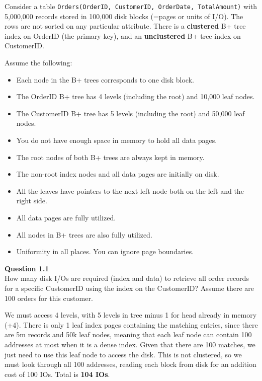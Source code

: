   \begin{example}
    Consider a table \texttt{Orders(OrderID, CustomerID, OrderDate, TotalAmount)} with 5,000,000 records stored in 100,000 disk blocks (=pages or units of I/O). The rows are not sorted on any particular attribute. There is a \textbf{clustered} B+ tree index on OrderID (the primary key), and an \textbf{unclustered} B+ tree index on CustomerID.

    Assume the following:
    \begin{itemize}
      \item Each node in the B+ trees corresponds to one disk block.
      \item The OrderID B+ tree has 4 levels (including the root) and 10,000 leaf nodes.
      \item The CustomerID B+ tree has 5 levels (including the root) and 50,000 leaf nodes.
      \item You do not have enough space in memory to hold all data pages.
      \item The root nodes of both B+ trees are always kept in memory.
      \item The non-root index nodes and all data pages are initially on disk.
      \item All the leaves have pointers to the next left node both on the left and the right side.
      \item All data pages are fully utilized.
      \item All nodes in B+ trees are also fully utilized.
      \item Uniformity in all places. You can ignore page boundaries.
    \end{itemize}

    \noindent\textbf{Question 1.1}\\
    How many disk I/Os are required (index and data) to retrieve all order records for a specific CustomerID using the index on the CustomerID? Assume there are 100 orders for this customer.

    We must access 4 levels, with 5 levels in tree minus 1 for head already in memory (+4). There is only 1 leaf index pages containing the matching entries, since there are 5m records and 50k leaf nodes, meaning that each leaf node can contain 100 addresses at most when it is a dense index. Given that there are 100 matches, we just need to use this leaf node to access the disk. This is not clustered, so we must look through all 100 addresses, reading each block from disk for an addition cost of 100 IOs. Total is \textbf{104 IOs}. 


\end{example}
